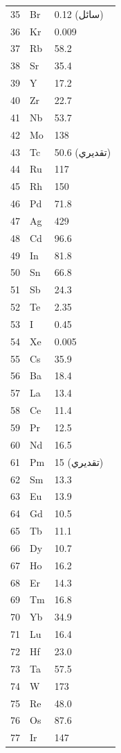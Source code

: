 \documentclass[11pt,a4paper]{article}
\begin{document}
\begin{otherlanguage}{arabic}
\begin{longtable}{p{0.6cm}p{1.2cm}p{1.5cm}}
			35 & Br & 0.12 (سائل) \\
			36 & Kr & 0.009 \\
			37 & Rb & 58.2 \\
			38 & Sr & 35.4 \\
			39 & Y  & 17.2 \\
			40 & Zr & 22.7 \\
			41 & Nb & 53.7 \\
			42 & Mo & 138 \\
			43 & Tc & 50.6 (تقديري) \\
			44 & Ru & 117 \\
			45 & Rh & 150 \\
			46 & Pd & 71.8 \\
			47 & Ag & 429 \\
			48 & Cd & 96.6 \\
			49 & In & 81.8 \\
			50 & Sn & 66.8 \\
			51 & Sb & 24.3 \\
			52 & Te & 2.35 \\
			53 & I  & 0.45 \\
			54 & Xe & 0.005 \\
			55 & Cs & 35.9 \\
			56 & Ba & 18.4 \\
			57 & La & 13.4 \\
			58 & Ce & 11.4 \\
			59 & Pr & 12.5 \\
			60 & Nd & 16.5 \\
			61 & Pm & 15 (تقديري) \\
			62 & Sm & 13.3 \\
			63 & Eu & 13.9 \\
			64 & Gd & 10.5 \\
			65 & Tb & 11.1 \\
			66 & Dy & 10.7 \\
			67 & Ho & 16.2 \\
			68 & Er & 14.3 \\
			69 & Tm & 16.8 \\
			70 & Yb & 34.9 \\
			71 & Lu & 16.4 \\
			72 & Hf & 23.0 \\
			73 & Ta & 57.5 \\
			74 & W  & 173 \\
			75 & Re & 48.0 \\
			76 & Os & 87.6 \\
			77 & Ir & 147 \\

\end{longtable}
\end{otherlanguage}
\end{document}
